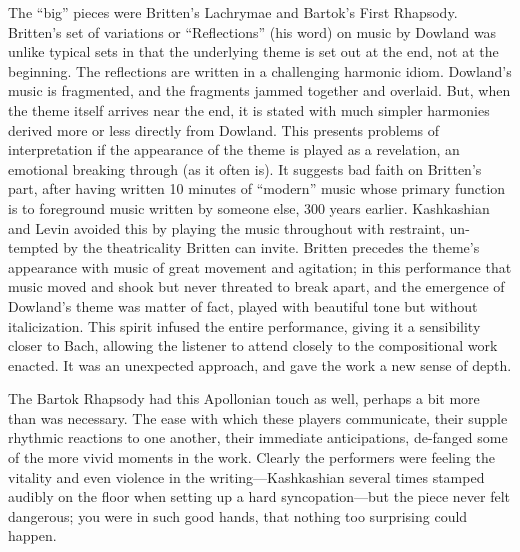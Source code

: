 The “big” pieces were Britten’s Lachrymae and Bartok’s First Rhapsody. Britten’s set of variations or “Reflections” (his word) on music by Dowland was unlike typical sets in that the underlying theme is set out at the end, not at the beginning. The reflections are written in a challenging harmonic idiom. Dowland’s music is fragmented, and the fragments jammed together and overlaid. But, when the theme itself arrives near the end, it is stated with much simpler harmonies derived more or less directly from Dowland. This presents problems of interpretation if the appearance of the theme is played as a revelation, an emotional breaking through (as it often is). It suggests bad faith on Britten’s part, after having written 10 minutes of “modern” music whose primary function is to foreground music written by someone else, 300 years earlier. Kashkashian and Levin avoided this by playing the music throughout with restraint, un-tempted by the theatricality Britten can invite. Britten precedes the theme’s appearance with music of great movement and agitation; in this performance that music moved and shook but never threated to break apart, and the emergence of Dowland’s theme was matter of fact, played with beautiful tone but without italicization. This spirit infused the entire performance, giving it a sensibility closer to Bach, allowing the listener to attend closely to the compositional work enacted. It was an unexpected approach, and gave the work a new sense of depth.

The Bartok Rhapsody had this Apollonian touch as well, perhaps a bit more than was necessary. The ease with which these players communicate, their supple rhythmic reactions to one another, their immediate anticipations, de-fanged some of the more vivid moments in the work. Clearly the performers were feeling the vitality and even violence in the writing—Kashkashian several times stamped audibly on the floor when setting up a hard syncopation—but the piece never felt dangerous; you were in such good hands, that nothing too surprising could happen.

